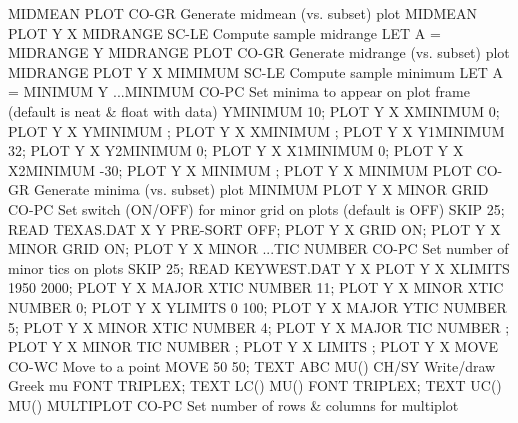 MIDMEAN PLOT                CO-GR Generate midmean (vs. subset) plot
                                  MIDMEAN PLOT Y X
MIDRANGE                    SC-LE Compute sample midrange
                                  LET A = MIDRANGE Y
MIDRANGE PLOT               CO-GR Generate midrange (vs. subset) plot
                                  MIDRANGE PLOT Y X
MIMIMUM                     SC-LE Compute sample minimum
                                  LET A = MINIMUM Y
...MINIMUM                  CO-PC Set minima to appear on plot frame
                                  (default is neat & float with data)
                                  YMINIMUM 10; PLOT Y X
                                  XMINIMUM 0; PLOT Y X
                                  YMINIMUM ; PLOT Y X
                                  XMINIMUM ; PLOT Y X
                                  Y1MINIMUM 32; PLOT Y X
                                  Y2MINIMUM 0; PLOT Y X
                                  X1MINIMUM 0; PLOT Y X
                                  X2MINIMUM -30; PLOT Y X
                                  MINIMUM ; PLOT Y X
MINIMUM PLOT                CO-GR Generate minima (vs. subset) plot
                                  MINIMUM PLOT Y X
MINOR GRID                  CO-PC Set switch (ON/OFF) for minor grid on plots
                                  (default is OFF)
                                  SKIP 25; READ TEXAS.DAT X Y
                                  PRE-SORT OFF; PLOT Y X
                                  GRID ON; PLOT Y X
                                  MINOR GRID ON; PLOT Y X
MINOR ...TIC NUMBER         CO-PC Set number of minor tics on plots
                                  SKIP 25; READ KEYWEST.DAT Y X
                                  PLOT Y X
                                  XLIMITS 1950 2000; PLOT Y X
                                  MAJOR XTIC NUMBER 11; PLOT Y X
                                  MINOR XTIC NUMBER 0; PLOT Y X
                                  YLIMITS 0 100; PLOT Y X
                                  MAJOR YTIC NUMBER 5; PLOT Y X
                                  MINOR XTIC NUMBER 4; PLOT Y X
                                  MAJOR TIC NUMBER ; PLOT Y X
                                  MINOR TIC NUMBER ; PLOT Y X
                                  LIMITS ; PLOT Y X
MOVE                        CO-WC Move to a point
                                  MOVE 50 50; TEXT ABC
MU()                        CH/SY Write/draw Greek mu
                                  FONT TRIPLEX; TEXT LC() MU()
                                  FONT TRIPLEX; TEXT UC() MU()
MULTIPLOT                   CO-PC Set number of rows & columns for multiplot
